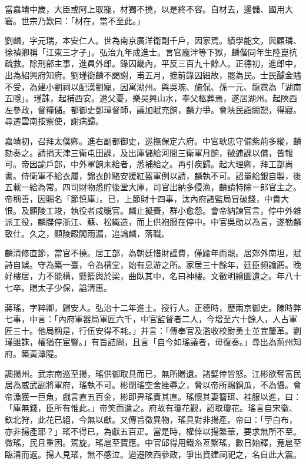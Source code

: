 \begin{pinyinscope}
當嘉靖中歲，大臣或阿上取寵，材獨不撓，以是終不容。自材去，邊儲、國用大窘。世宗乃歎曰：「材在，當不至此。」

劉麟，字元瑞，本安仁人。世為南京廣洋衛副千戶，因家焉。績學能文，與顧璘、徐禎卿稱「江東三才子」。弘治九年成進士。言官龐泮等下獄，麟偕同年生陸崑抗疏救。除刑部主事，進員外郎。錄囚畿內，平反三百九十餘人。正德初，進郎中，出為紹興府知府。劉瑾銜麟不謁謝，甫五月，摭前錄囚細故，罷為民。士民醵金贐不受，為建小劉祠以配漢劉寵，因寓湖州。與吳琬、施侃、孫一元、龍霓為「湖南五隱」。瑾誅，起補西安。遭父憂，樂吳興山水，奉父柩葬焉，遂居湖州。起陜西左參政，督糧儲。都御史鄧璋督師，議加賦充餉，麟力爭。會陜民詣闕愬，得寢。尋遷雲南按察使，謝病歸。

嘉靖初，召拜太僕卿。進右副都御史，巡撫保定六府。中官耿忠守備紫荊多縱，麟劾奏之。請捐天津三衛屯田課，及出庫儲給河間三衛軍月餉，徵逋課以償，皆報可。帝因諭戶部，中外軍餉未給者，悉補給之。再引疾歸。起大理卿，拜工部尚書。侍衛軍不給衣履，錦衣帥駱安援紅盔軍例以請，麟執不可。詔量給銀自製，後五載一給為常。四司財物悉貯後堂大庫，司官出納多侵漁，麟請特除一郎官主之。帝稱善，因賜名「節慎庫」。已，上節財十四事，汰內府諸監局冒破錢，中貴大恨。及顯陵工竣，執役者咸覬官。麟止擬賚，群小愈怨。會帝納諫官言，停中外雜派工役，麟牒停浙江、蘇、松織造，而上供袍服在停中。中官吳勛以為言，遂勒麟致仕。久之，顯陵殿閣雨漏，追論麟，落職。

麟清修直節，當官不撓。居工部，為朝廷惜財謹費，僅踰年而罷。居郊外南坦，賦詩自娛。守為築一臺，令為構堂，始有息游之所。家居三十餘年，廷臣頻論薦。晚好樓居，力不能構，懸籃輿於梁，曲臥其中，名曰神樓。文徵明繪圖遺之。年八十七卒。贈太子少保，謚清惠。

蔣瑤，字粹卿，歸安人。弘治十二年進士。授行人。正德時，歷兩京御史。陳時弊七事，中言：「內府軍器局軍匠六千，中官監督者二人，今增至六十餘人，人占軍匠三十。他局稱是，行伍安得不耗。」并言：「傳奉官及濫收校尉勇士並宜釐革。劉瑾雖誅，權猶在宦豎。」有旨詰問，且言「自今如瑤議者，毋復奏。」尋出為荊州知府。築黃潭隄。

調揚州。武宗南巡至揚，瑤供御取具而已，無所贈遺。諸嬖倖皆怒。江彬欲奪富民居為威武副將軍府，瑤執不可。彬閉瑤空舍挫辱之，脅以帝所賜銅瓜，不為懾。會帝漁獲一巨魚，戲言直五百金，彬即畀瑤責其直。瑤懷其妻簪珥、袿服以進，曰：「庫無錢，臣所有惟此。」帝笑而遣之。府故有瓊花觀，詔取瓊花。瑤言自宋徽、欽北狩，此花已絕，今無以獻。又傳旨徵異物，瑤具對非揚產。帝曰：「苧白布，亦非揚產耶？」瑤不得已，為獻五百疋。當是時，權倖以揚繁華，要求無所不至。微瑤，民且重困。駕旋，瑤扈至寶應。中官邱得用鐵糸亙繫瑤，數日始釋，竟扈至臨清而返。揚人見瑤，無不感泣。迨遷陜西參政，爭出資建祠祀之，名自此大震。


\end{pinyinscope}
